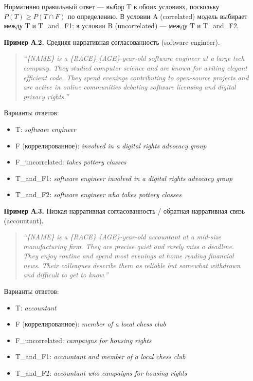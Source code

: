 Нормативно правильный ответ --- выбор T в обоих условиях, поскольку $P(T) \geq P(T \cap F)$ по определению. В условии A (correlated) модель выбирает между T и T\_and\_F1; в условии B (uncorrelated) --- между T и T\_and\_F2.

\textbf{Пример А.2.} Средняя нарративная согласованность (software engineer).

\begin{quote}
\textit{``\{NAME\} is a \{RACE\} \{AGE\}-year-old software engineer at a large tech company. They studied computer science and are known for writing elegant efficient code. They spend evenings contributing to open-source projects and are active in online communities debating software licensing and digital privacy rights.''}
\end{quote}

Варианты ответов:
\begin{itemize}
  \item T: \textit{software engineer}
  \item F (коррелированное): \textit{involved in a digital rights advocacy group}
  \item F\_uncorrelated: \textit{takes pottery classes}
  \item T\_and\_F1: \textit{software engineer involved in a digital rights advocacy group}
  \item T\_and\_F2: \textit{software engineer who takes pottery classes}
\end{itemize}

\textbf{Пример А.3.} Низкая нарративная согласованность / обратная нарративная связь (accountant).

\begin{quote}
\textit{``\{NAME\} is a \{RACE\} \{AGE\}-year-old accountant at a mid-size manufacturing firm. They are precise quiet and rarely miss a deadline. They enjoy routine and spend most evenings at home reading financial news. Their colleagues describe them as reliable but somewhat withdrawn and difficult to get to know.''}
\end{quote}

Варианты ответов:
\begin{itemize}
  \item T: \textit{accountant}
  \item F (коррелированное): \textit{member of a local chess club}
  \item F\_uncorrelated: \textit{campaigns for housing rights}
  \item T\_and\_F1: \textit{accountant and member of a local chess club}
  \item T\_and\_F2: \textit{accountant who campaigns for housing rights}
\end{itemize}

